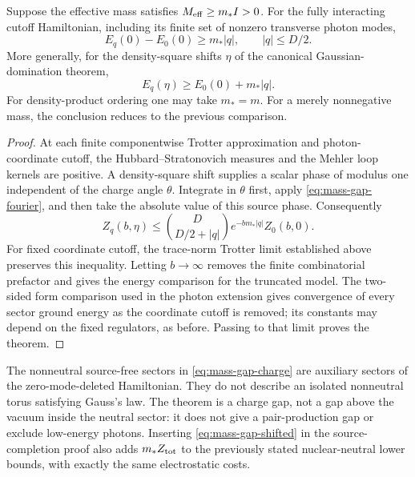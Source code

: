 \begin{theorem}
\label{thm:mass-gap-charge}
Suppose the effective mass satisfies $M_{\mathrm{eff}}\ge m_*I>0$.
For the fully interacting cutoff Hamiltonian, including its finite set
of nonzero transverse photon modes,
\begin{equation}
 E_q(0)-E_0(0)\ge m_*|q|,\qquad |q|\le D/2.
 \label{eq:mass-gap-charge}
\end{equation}
More generally, for the density-square shifts $\eta$ of the canonical
Gaussian-domination theorem,
\begin{equation}
 E_q(\eta)\ge E_0(0)+m_*|q|.
 \label{eq:mass-gap-shifted}
\end{equation}
For density-product ordering one may take $m_*=m$. For a merely
nonnegative mass, the conclusion reduces to the previous comparison.
\end{theorem}
\begin{proof}
At each finite componentwise Trotter approximation and photon-coordinate
cutoff, the Hubbard--Stratonovich measures and the Mehler loop kernels
are positive. A density-square shift supplies a scalar phase of modulus
one independent of the charge angle $\theta$. Integrate in $\theta$
first, apply \eqref{eq:mass-gap-fourier}, and then take the absolute value
of this source phase. Consequently
\begin{equation}
 Z_q(b,\eta)\le\binom{D}{D/2+|q|}
 e^{-bm_*|q|}Z_0(b,0).
 \label{eq:mass-gap-thermal}
\end{equation}
For fixed coordinate cutoff, the trace-norm Trotter limit established
above preserves this inequality. Letting $b\to\infty$ removes the
finite combinatorial prefactor and gives the energy comparison for the
truncated model. The two-sided form comparison used in the photon
extension gives convergence of every sector ground energy as the
coordinate cutoff is removed; its constants may depend on the fixed
regulators, as before. Passing to that limit proves the theorem.
\end{proof}

The nonneutral source-free sectors in \eqref{eq:mass-gap-charge} are
auxiliary sectors of the zero-mode-deleted Hamiltonian. They do not
describe an isolated nonneutral torus satisfying Gauss's law. The theorem
is a charge gap, not a gap above the vacuum inside the neutral sector:
it does not give a pair-production gap or exclude low-energy photons.
Inserting \eqref{eq:mass-gap-shifted} in the source-completion proof also
adds $m_*Z_{\rm tot}$ to the previously stated nuclear-neutral lower
bounds, with exactly the same electrostatic costs.

